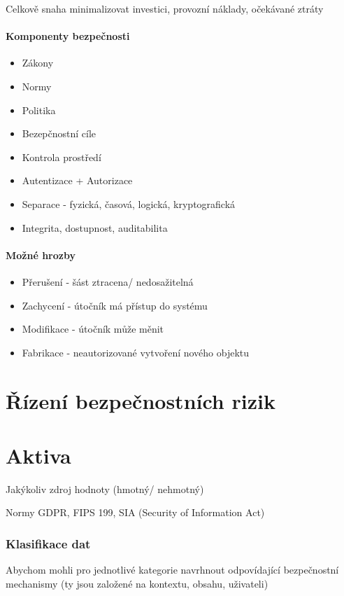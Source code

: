 \documentclass[10pt,a4paper]{article}
\begin{document}
Celkově snaha minimalizovat investici, provozní náklady, očekávané ztráty

\paragraph*{Komponenty bezpečnosti} \begin{itemize} \setlength\itemsep{0em}
    \item Zákony
    \item Normy
    \item Politika
    \item Bezepčnostní cíle
    \item Kontrola prostředí
    \item Autentizace + Autorizace
    \item Separace - fyzická, časová, logická, kryptografická
    \item Integrita, dostupnost, auditabilita
\end{itemize}

\paragraph*{Možné hrozby} \begin{itemize}\setlength\itemsep{0em}
    \item Přerušení - šást ztracena/ nedosažitelná
    \item Zachycení - útočník má přístup do systému
    \item Modifikace - útočník může měnit
    \item Fabrikace - neautorizované vytvoření nového objektu
\end{itemize}

\section{Řízení bezpečnostních rizik}
\newpage

\section{Aktiva}
Jakýkoliv zdroj hodnoty (hmotný/ nehmotný)

Normy GDPR, FIPS 199, SIA (Security of Information Act) 

\subsubsection*{Klasifikace dat}
Abychom mohli pro jednotlivé kategorie navrhnout odpovídající bezpečnostní mechanismy (ty jsou založené na kontextu, obsahu, uživateli)
\end{document}
